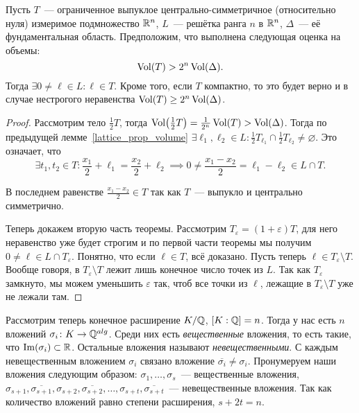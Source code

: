 	\begin{lemma}\label{Mink_theorem}
		Пусть $T$~--- ограниченное выпуклое центрально-симметричное (относительно нуля) измеримое подмножество $\mathbb{R}^n$, $L$~--- решётка ранга $n$ в $\mathbb{R}^n$, $\Delta$~--- её фундаментальная область. Предположим, что выполнена следующая оценка на объемы:
		\[
			\operatorname{Vol}(T) > 2^n \operatorname{Vol}(\Delta).
		\]
		Тогда $\exists 0 \neq \ell \in L\colon \ell \in T$. Кроме того, если $T$ компактно, то это будет верно и в случае нестрогого неравенства $\operatorname{Vol}(T) \ge 2^n \operatorname{Vol}(\Delta)$.
	\end{lemma}
	\begin{proof}
		Рассмотрим тело $\frac{1}{2}T$, тогда $\Vol\lr*{\frac{1}{2}T} = \frac{1}{2^n} \Vol(T) > \Vol(\Delta)$. Тогда по предыдущей лемме~\ref{lattice_prop_volume}  $\exists \ell_1, \ell_2 \in L\colon \frac{1}{2}T_{\ell_1} \cap \frac{1}{2}T_{\ell_{2}} \neq \varnothing$. Это означает, что
		 \[ \exists t_1, t_2 \in T\colon \frac{x_1}{2} + \ell_1 = \frac{x_2}{2} + \ell_2 \implies 0 \neq \frac{x_1 - x_2}{2} = \ell_1 - \ell_2 \in L \cap T.\]

		 В последнем равенстве $\frac{x_1 - x_2}{2} \in T$ так как $T$~--- выпукло и центрально симметрично. 

		 Теперь докажем вторую часть теоремы. Рассмотрим $T_{\varepsilon} = (1 + \varepsilon)T$, для него неравенство уже будет строгим и по первой части теоремы мы получим $0\neq \ell \in L \cap T_{\varepsilon}$. Понятно, что если $\ell \in T$, всё доказано. Пусть теперь $\ell \in T_{\varepsilon} \setminus T$. Вообще говоря, в $T_{\varepsilon} \setminus T$  лежит лишь конечное число точек из $L$. Так как $T_{\varepsilon}$ замкнуто, мы можем уменьшить $\varepsilon$ так, чтоб все точки из $\ell$, лежащие в $T_{\varepsilon}\setminus T$ уже не лежали там. 
	\end{proof}

	\hypertarget{real_and_complex_inclusions}{}
	Рассмотрим теперь конечное расширение $K/\mathbb{Q}$, $[K : \mathbb{Q}] = n$. Тогда у нас есть $n$ вложений $\sigma_i \colon K \to \mathbb{Q}^{alg}$. Среди них есть \emph{вещественные} вложения, то есть такие, что $\mathop{\mathrm{Im}}\nolimits(\sigma_i) \subset \mathbb{R}$. Остальные вложения  называют \emph{невещественными}. С каждым невещественным вложением $\sigma_i$ связано вложение $\overline{\sigma_i} \neq \sigma_i$. Пронумеруем наши вложения следующим образом: $\sigma_1, \ldots, \sigma_s$~--- вещественные вложения, $\sigma_{s + 1}, \overline{\sigma_{s + 1}}, \sigma_{s + 2}, \overline{\sigma_{s + 2}}, \ldots, \sigma_{s + t}, \overline{\sigma_{s + t}}$~--- невещественные вложения. Так как количество вложений равно степени расширения, $s + 2t = n$.

